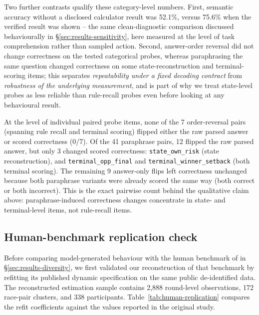 \documentclass[sigconf]{aamas}
\begin{document}
Two further contrasts qualify these category-level numbers. First, semantic
accuracy without a disclosed calculator result was 52.1\%, versus 75.6\%
when the verified result was shown -- the same clean-diagnostic comparison
discussed behaviourally in \S\ref{sec:results-sensitivity}, here measured
at the level of task comprehension rather than sampled action. Second,
answer-order reversal did not change correctness on the tested categorical
probes, whereas paraphrasing the same question changed correctness on some
state-reconstruction and terminal-scoring items; this separates
\emph{repeatability under a fixed decoding contract} from
\emph{robustness of the underlying measurement}, and is part of why we
treat state-level probes as less reliable than rule-recall probes even
before looking at any behavioural result.

At the level of individual paired probe items, none of the 7 order-reversal
pairs (spanning rule recall and terminal scoring) flipped either the raw
parsed answer or scored correctness (0/7). Of the 41 paraphrase pairs, 12
flipped the raw parsed answer, but only 3 changed scored correctness:
\texttt{state\_own\_risk} (state reconstruction), and
\texttt{terminal\_opp\_final} and \texttt{terminal\_winner\_setback} (both
terminal scoring). The remaining 9 answer-only flips left correctness
unchanged because both paraphrase variants were already scored the same
way (both correct or both incorrect). This is the exact pairwise count
behind the qualitative claim above: paraphrase-induced correctness changes
concentrate in state- and terminal-level items, not rule-recall items.

\subsection{Human-benchmark replication check}
\label{app:human-benchmark-replication}

Before comparing model-generated behaviour with the human benchmark of
\citet{falling_behind_unsafe} in \S\ref{sec:results-diversity}, we first
validated our reconstruction of that benchmark by refitting its published
dynamic specification on the same public de-identified data. The
reconstructed estimation sample contains 2{,}888 round-level observations,
172 race-pair clusters, and 338 participants. Table~\ref{tab:human-replication} compares the refit coefficients against the values reported in the
original study.
\end{document}
